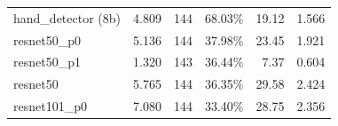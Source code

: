 \begin{table}[]
\begin{tabular}{@{}lrrrrr@{}}
hand\_detector (8b)                                  & 4.809                                                           & 144            & 68.03\%            & 19.12                                                             & 1.566                                                                      \\
resnet50\_p0                                         & 5.136                                                           & 144            & 37.98\%            & 23.45                                                             & 1.921                                                                      \\
resnet50\_p1                                         & 1.320                                                           & 143            & 36.44\%            & 7.37                                                              & 0.604                                                                      \\
resnet50                                             & 5.765                                                           & 144            & 36.35\%            & 29.58                                                             & 2.424                                                                      \\
resnet101\_p0                                        & 7.080                                                           & 144            & 33.40\%            & 28.75                                                             & 2.356                                                                      \\

\end{tabular}
\end{table}
